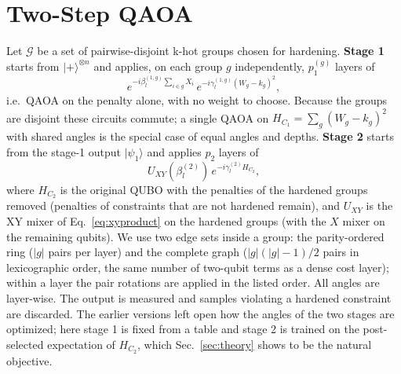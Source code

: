 \documentclass{article}
\begin{document}
\section{Two-Step QAOA}
\label{sec:method}
Let $\mathcal G$ be a set of pairwise-disjoint k-hot groups chosen for hardening.
\textbf{Stage 1} starts from $|+\rangle^{\otimes n}$ and applies, on each group $g$ independently, $p_1^{(g)}$ layers of
\begin{equation}
e^{-i\beta^{(1,g)}_l\sum_{i\in g}X_i}\,e^{-i\gamma^{(1,g)}_l (W_g-k_g)^2},
\end{equation}
i.e.\ QAOA on the penalty alone, with no weight to choose. Because the groups are disjoint these circuits commute; a single QAOA on $H_{C_1}=\sum_g(W_g-k_g)^2$ with shared angles is the special case of equal angles and depths.
\textbf{Stage 2} starts from the stage-1 output $|\psi_1\rangle$ and applies $p_2$ layers of
\begin{equation}
U_{XY}(\beta^{(2)}_l)\,e^{-i\gamma^{(2)}_l H_{C_2}},
\end{equation}
where $H_{C_2}$ is the original QUBO with the penalties of the hardened groups removed (penalties of constraints that are not hardened remain), and $U_{XY}$ is the XY mixer of Eq.~\eqref{eq:xyproduct} on the hardened groups (with the $X$ mixer on the remaining qubits). We use two edge sets inside a group: the parity-ordered ring ($|g|$ pairs per layer) and the complete graph ($|g|(|g|-1)/2$ pairs in lexicographic order, the same number of two-qubit terms as a dense cost layer); within a layer the pair rotations are applied in the listed order.
All angles are layer-wise.
The output is measured and samples violating a hardened constraint are discarded.
The earlier versions left open how the angles of the two stages are optimized; here stage 1 is fixed from a table and stage 2 is trained on the post-selected expectation of $H_{C_2}$, which Sec.~\ref{sec:theory} shows to be the natural objective.




\end{document}
